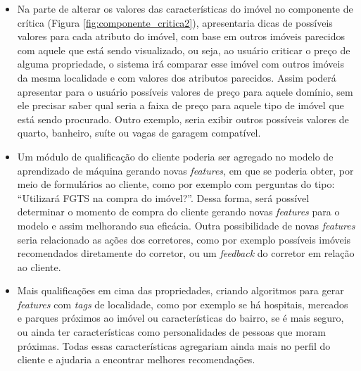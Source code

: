 \begin{itemize}
  \item Na parte de alterar os valores das características do imóvel no componente de crítica (Figura \ref{fig:componente_critica2}), apresentaria dicas de possíveis valores para cada atributo do imóvel, com base em outros imóveis parecidos com aquele que está sendo visualizado, ou seja, ao usuário criticar o preço de alguma propriedade, o sistema irá comparar esse imóvel com outros imóveis da mesma localidade e com valores dos atributos parecidos. Assim poderá apresentar para o usuário possíveis valores de preço para aquele domínio, sem ele precisar saber qual seria a faixa de preço para aquele tipo de imóvel que está sendo procurado. Outro exemplo, seria exibir outros possíveis valores de quarto, banheiro, suíte ou vagas de garagem compatível.

 
 \item Um módulo de qualificação do cliente poderia ser agregado no modelo de aprendizado de máquina gerando novas \textit{features}, em que se poderia obter, por meio de formulários ao cliente, como por exemplo com perguntas do tipo: “Utilizará FGTS na compra do imóvel?''. Dessa forma, será possível determinar o momento de compra do cliente gerando novas \textit{features} para o modelo e assim melhorando sua eficácia. Outra possibilidade de novas \textit{features} seria relacionado as ações dos corretores, como por exemplo possíveis imóveis recomendados diretamente do corretor, ou um \textit{feedback} do corretor em relação ao cliente.
  

\item Mais qualificações em cima das propriedades, criando algoritmos para gerar \textit{features} com \textit{tags} de localidade, como por exemplo se há hospitais, mercados e parques próximos ao imóvel ou características do bairro, se é mais seguro, ou ainda ter características como personalidades de pessoas que moram próximas. Todas essas características agregariam ainda mais no perfil do cliente e ajudaria a encontrar melhores recomendações.
\end{itemize}


